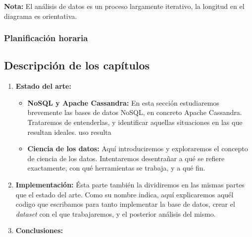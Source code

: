 \begin{center}
  \textbf{Nota: } El análisis de datos es un proceso largamente iterativo, la
  longitud en el diagrama es orientativa.
\end{center}


\subsubsection{Planificación horaria}
\label{subsubsec:hores}

\subsection{Descripción de los capítulos}
\label{subsec:chaps}


\begin{enumerate}
  \item \textbf{Estado del arte: }
    \begin{itemize}
      \item \textbf{NoSQL y Apache Cassandra: } En esta sección estudiaremos
        brevemente las bases de datos NoSQL, en concreto Apache Cassandra.
        Trataremos de entenderlas, y identificar aquellas situaciones en las que
        resultan ideales.
        uso resulta
      \item \textbf{Ciencia de los datos: } Aquí introduciremos y exploraremos el
        concepto de ciencia de los datos. Intentaremos desentrañar a qué se refiere
        exactamente, con qué herramientas se trabaja, y a qué fin.
    \end{itemize}
  \item \textbf{Implementación: }  Ésta parte también la dividiremos en las
    mismas partes que el estado del arte. Como su nombre indica, aquí
    explicaremos aquél codigo que escribamos para tanto implementar la base de
    datos, crear el \emph{dataset} con el que trabajaremos, y el posterior
    análisis del mismo.
  \item \textbf{Conclusiones: } 
\end{enumerate}
\clearpage
